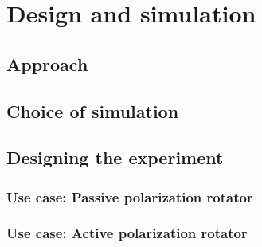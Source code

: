 \documentclass[../main.tex]{subfiles}
\begin{document}
	

\chapter{Design and simulation}

	\section{Approach}

	\section{Choice of simulation}

	\section{Designing the experiment}

		\subsection{Use case: Passive polarization rotator}
	
		\subsection{Use case: Active polarization rotator}
	
\end{document}
